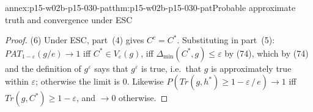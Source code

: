 \begin{annexitem}{annex:p15-w02b-p15-030-pat}{thm:p15-w02b-p15-030-pat}{Probable approximate truth and convergence under ESC}
\begin{proof}
(6) Under ESC, part~(4) gives \(C^c=C^*\). Substituting in part~(5):
\(PAT_{1-\varepsilon}(g/e)\to1\) iff \(C^*\in V_\varepsilon(g)\), iff
\(\Delta_{\min}(C^*,g)\leq\varepsilon\) by (74), which by (74) and the
definition of \(g^\varepsilon\) says that \(g^\varepsilon\) is true, i.e.\ that
\(g\) is approximately true within \(\varepsilon\); otherwise the limit is
\(0\). Likewise \(P(Tr(g,h^*)\geq1-\varepsilon\,/\,e)\to1\) iff
\(Tr(g,C^*)\geq1-\varepsilon\), and \(\to0\) otherwise.
\end{proof}
\end{annexitem}
